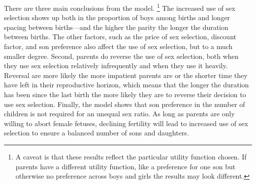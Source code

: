 \documentclass[12pt,letterpaper]{article}
\begin{document}



There are three main conclusions from the model.%
\footnote{
A caveat is that these results reflect the particular utility 
function chosen.
If parents have a different utility function, like a preference
for one son but otherwise no preference across boys and girls
the results may look different.
}
The increased use of sex selection shows up both in the 
proportion of boys among births and longer spacing between 
births---and the higher the parity the longer the duration between 
births.
The other factors, such as the price of sex selection, 
discount factor, and son preference also affect the use
of sex selection, but to a much smaller degree.
Second, parents do reverse the use of sex selection, 
both when they use sex selection relatively infrequently and when 
they use it heavily.
Reversal are more likely the more impatient parents are or the
shorter time they have left in their reproductive horizon, which
means that the longer the duration has been since the last birth
the more likely they are to reverse their decision to use sex selection.
Finally, the model shows that son preference in the number of
children is not required for an unequal sex ratio.
As long as parents are only willing to abort female fetuses, declining
fertility will lead to increased use of sex selection to ensure 
a balanced number of sons and daughters.
\end{document}
